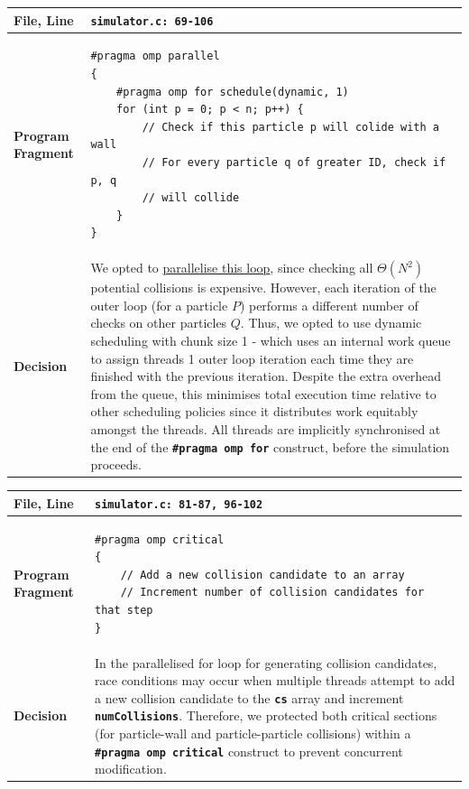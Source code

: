 \documentclass[12pt]{article}
\newcommand{\bt}[1]{\texttt{\textbf{#1}}}
\begin{document}
\begin{center}
\begin{tabular}{ | m{5em} | m{33em} | } 
\hline
\textbf{File, Line} & \bt{simulator.c: 69-106} \\ \hline
\textbf{Program Fragment} &
\begin{verbatim}
#pragma omp parallel
{
    #pragma omp for schedule(dynamic, 1)
    for (int p = 0; p < n; p++) {
        // Check if this particle p will colide with a wall
        // For every particle q of greater ID, check if p, q
        // will collide
    }
}
\end{verbatim}
\\ \hline
\textbf{Decision} &
We opted to \ul{parallelise this loop}, since checking all $\Theta(N^2)$ potential collisions is expensive. However, each iteration of the outer loop (for a particle $P$) performs a different number of checks on other particles $Q$. Thus, we opted to use dynamic scheduling with chunk size 1 - which uses an internal work queue to assign threads 1 outer loop iteration each time they are finished with the previous iteration. Despite the extra overhead from the queue, this minimises total execution time relative to other scheduling policies since it distributes work equitably amongst the threads. All threads are implicitly synchronised at the end of the \bt{\#pragma omp for} construct, before the simulation proceeds.
\\ \hline
\end{tabular}
\end{center}

\begin{center}
\begin{tabular}{ | m{5em} | m{33em} | } 
\hline
\textbf{File, Line} & \bt{simulator.c: 81-87, 96-102} \\ \hline
\textbf{Program Fragment} &
\begin{verbatim}
#pragma omp critical
{
    // Add a new collision candidate to an array
    // Increment number of collision candidates for that step
}
\end{verbatim}
\\ \hline
\textbf{Decision} &
In the parallelised for loop for generating collision candidates, race conditions may occur when multiple threads attempt to add a new collision candidate to the \bt{cs} array and increment \bt{numCollisions}. Therefore, we protected both critical sections (for particle-wall and particle-particle collisions) within a \bt{\#pragma omp critical} construct to prevent concurrent modification.
\\ \hline
\end{tabular}
\end{center}
\end{document}
